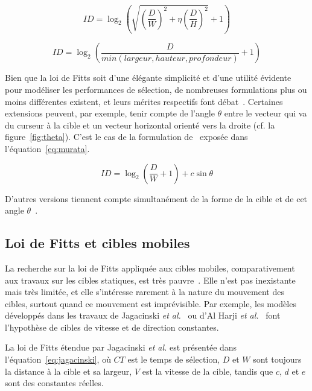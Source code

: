 	\begin{equation}
		\label{eq:accot}
		ID = \log_2\left( \sqrt{ \left( \frac{D}{W} \right) ^2 + \eta \left( \frac{D}{H} \right) ^2}  + 1\right)
	\end{equation}
	
	\begin{equation}
		\label{eq:ware}
		ID = \log_2\left( \frac{D}{min(largeur,hauteur,profondeur)} + 1\right)
	\end{equation}
	
	Bien que la loi de Fitts soit d'une élégante simplicité et d'une utilité évidente pour modéliser les performances de sélection, de nombreuses formulations plus ou moins différentes existent, et leurs mérites respectifs font débat~\cite{casallas2015prediction}. Certaines extensions peuvent, par exemple, tenir compte de l'angle $\theta$ entre le vecteur qui va du curseur à la cible et un vecteur horizontal orienté vers la droite (cf. la figure~\ref{fig:theta}). C'est le cas de la formulation de~\cite{murata2001extending} exposée dans l'équation~\ref{eq:murata}.
	
	\begin{equation}
		\label{eq:murata}
		ID = \log_2\left(\frac{D}{W} + 1\right) + c \sin \theta
	\end{equation}
	
	D'autres versions tiennent compte simultanément de la forme de la cible et de cet angle $\theta$~\cite{appert2008evaluation, grossman2004pointing}.
	
	\subsection{Loi de Fitts et cibles mobiles}
	\label{sub:fittsMobile}
	La recherche sur la loi de Fitts appliquée aux cibles mobiles, comparativement aux travaux sur les cibles statiques, est très pauvre~\cite{casallas2015prediction}. Elle n'est pas inexistante~\cite{jagacinski1980test, hoffmann1991capture, hajri2011moving} mais très limitée, et elle s'intéresse rarement à la nature du mouvement des cibles, surtout quand ce mouvement est imprévisible. Par exemple, les modèles développés dans les travaux de Jagacinski \emph{et al.}~\cite{jagacinski1980test} ou d'Al Harji \emph{et al.}~\cite{hajri2011moving} font l'hypothèse de cibles de vitesse et de direction constantes.
	
	La loi de Fitts étendue par Jagacinski \emph{et al.} est présentée dans l'équation~\ref{eq:jagacinski}, où $CT$ est le temps de sélection, $D$ et $W$ sont toujours la distance à la cible et sa largeur, $V$ est la vitesse de la cible, tandis que $c$, $d$ et $e$ sont des constantes réelles.
	
